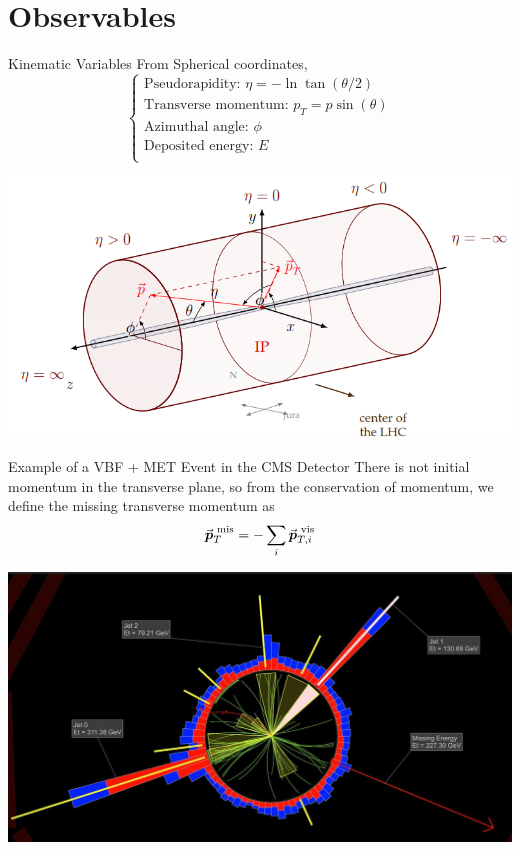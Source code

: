 \documentclass{../../bredelebeamer}
\begin{document}
\section{Observables}
\begin{frame}{Kinematic Variables}
    From Spherical coordinates,
    $$
    \begin{cases}
        \text{Pseudorapidity: } \eta = -\ln\tan(\theta/2) \\
        \text{Transverse momentum: } p_T = p \sin(\theta) \\
        \text{Azimuthal angle: } \phi\\
        \text{Deposited energy: } E \\
    \end{cases}
    $$

	\begin{center}
		\includegraphics[width=.98\linewidth]{../Images/Kinematic_Variables.png}
	\end{center}
\end{frame}

\begin{frame}{Example of a VBF + MET Event in the CMS Detector}
    There is not initial momentum in the transverse plane, so from the conservation of momentum, we define the missing transverse momentum as
    $$
        \va*{p}_T^{\text{ mis}} = - \sum_{i} \va*{p}_{T,i}^{\text{ vis}}
    $$
    \begin{center}
        \includegraphics[width=.90\linewidth]{../Images/real_vbf_event.png}
    \end{center}
\end{frame}
\end{document}
